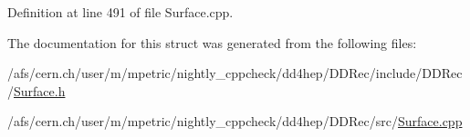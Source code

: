 Definition at line 491 of file Surface.\+cpp.



The documentation for this struct was generated from the following files\+:\begin{DoxyCompactItemize}
\item 
/afs/cern.\+ch/user/m/mpetric/nightly\+\_\+cppcheck/dd4hep/\+D\+D\+Rec/include/\+D\+D\+Rec/\hyperlink{_surface_8h}{Surface.\+h}\item 
/afs/cern.\+ch/user/m/mpetric/nightly\+\_\+cppcheck/dd4hep/\+D\+D\+Rec/src/\hyperlink{_surface_8cpp}{Surface.\+cpp}\end{DoxyCompactItemize}
